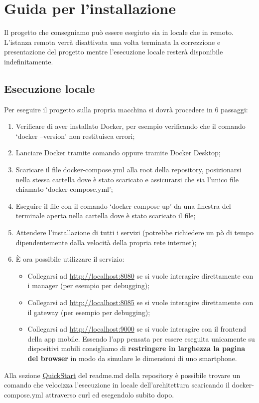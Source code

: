 \section{Guida per l'installazione}
Il progetto che consegniamo può essere esegiuto sia in locale che in remoto. L'istanza remota verrà disattivata una volta terminata la correzzione e presentazione del progetto mentre l'esecuzione locale resterà disponibile indefinitamente.
\subsection{Esecuzione locale}
Per eseguire il progetto sulla propria macchina si dovrà procedere in 6 passaggi:
\begin{enumerate}
  \item Verificare di aver installato Docker, per esempio verificando che il comando `docker --version' non restituisca errori;
  \item Lanciare Docker tramite comando oppure tramite Docker Desktop;
  \item Scaricare il file docker-compose.yml alla root della repository, posizionarsi nella stessa cartella dove è stato scaricato e assicurarsi che sia l'unico file chiamato `docker-compose.yml';
  \item Eseguire il file con il comando `docker compose up' da una finestra del terminale aperta nella cartella dove è stato scaricato il file;
  \item Attendere l'installazione di tutti i servizi (potrebbe richiedere un pò di tempo dipendentemente dalla velocità della propria rete internet);
  \item È ora possibile utilizzare il servizio:
  \begin{itemize}
    \item Collegarsi ad \href{http://localhost:8080}{http://localhost:8080} se si vuole interagire direttamente con i manager (per esempio per debugging);
    \item Collegarsi ad \href{http://localhost:8085}{http://localhost:8085} se si vuole interagire direttamente con il gateway (per esempio per debugging);
    \item Collegarsi ad \href{http://localhost:9000}{http://localhost:9000} se si vuole interagire con il frontend della app mobile. Essendo l'app pensata per essere eseguita unicamente su dispositivi mobili consigliamo di \textbf{restringere in larghezza la pagina del browser} in modo da simulare le dimensioni di uno smartphone.
  \end{itemize}
\end{enumerate}
Alla sezione \href{https://github.com/FI-153/Progetto-PAC-2023-24/blob/main/README.md#quickstart}{QuickStart} del readme.md della repository è possibile trovare un comando che velocizza l'esecuzione in locale dell'architettura scaricando il docker-compose.yml attraverso curl ed esegendolo subito dopo.
